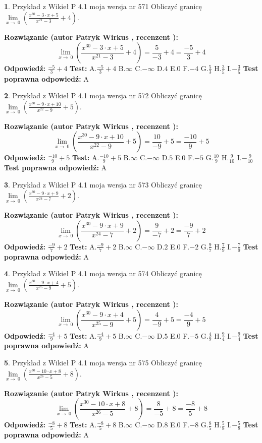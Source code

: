\documentclass[12pt, a4paper]{article}
\theoremstyle{definition} %
\newtheorem{zad}{}
\newcommand{\zadStart}[1]{\begin{zad}#1\newline}
\newcommand{\zadStop}{\end{zad}}
\newcommand{\rozwStart}[2]{\noindent \textbf{Rozwiązanie (autor #1 , recenzent #2): }\newline}
\newcommand{\rozwStop}{\newline}
\newcommand{\odpStart}{\noindent \textbf{Odpowiedź:}\newline}
\newcommand{\odpStop}{\newline}
\newcommand{\testStart}{\noindent \textbf{Test:}\newline}
\newcommand{\testStop}{\newline}
\newcommand{\kluczStart}{\noindent \textbf{Test poprawna odpowiedź:}\newline}
\newcommand{\kluczStop}{\newline}
\begin{document}
\zadStart{Przykład z Wikieł P 4.1 moja wersja nr 571}
Obliczyć granicę $\lim\limits_{x\to\ 0}(\frac{x^{30}-3 \cdot x +5}{x^{21}-3}+4)$.
\zadStop
\rozwStart{Patryk Wirkus}{}
$$\lim\limits_{x\to\ 0}(\frac{x^{30}-3 \cdot x +5}{x^{21}-3}+4)=\frac{5}{-3}+4=\frac{-5}{3}+4$$
\rozwStop
\odpStart
$\frac{-5}{3}+4$
\odpStop
\testStart
A.$\frac{-5}{3}+4$
B.$\infty$
C.$-\infty$
D.$4$
E.$0$
F.$-4$
G.$\frac{5}{3}$
H.$\frac{3}{5}$
I.$-\frac{3}{5}$
\testStop
\kluczStart
A
\kluczStop



\zadStart{Przykład z Wikieł P 4.1 moja wersja nr 572}
Obliczyć granicę $\lim\limits_{x\to\ 0}(\frac{x^{30}-9 \cdot x +10}{x^{22}-9}+5)$.
\zadStop
\rozwStart{Patryk Wirkus}{}
$$\lim\limits_{x\to\ 0}(\frac{x^{30}-9 \cdot x +10}{x^{22}-9}+5)=\frac{10}{-9}+5=\frac{-10}{9}+5$$
\rozwStop
\odpStart
$\frac{-10}{9}+5$
\odpStop
\testStart
A.$\frac{-10}{9}+5$
B.$\infty$
C.$-\infty$
D.$5$
E.$0$
F.$-5$
G.$\frac{10}{9}$
H.$\frac{9}{10}$
I.$-\frac{9}{10}$
\testStop
\kluczStart
A
\kluczStop



\zadStart{Przykład z Wikieł P 4.1 moja wersja nr 573}
Obliczyć granicę $\lim\limits_{x\to\ 0}(\frac{x^{30}-9 \cdot x +9}{x^{24}-7}+2)$.
\zadStop
\rozwStart{Patryk Wirkus}{}
$$\lim\limits_{x\to\ 0}(\frac{x^{30}-9 \cdot x +9}{x^{24}-7}+2)=\frac{9}{-7}+2=\frac{-9}{7}+2$$
\rozwStop
\odpStart
$\frac{-9}{7}+2$
\odpStop
\testStart
A.$\frac{-9}{7}+2$
B.$\infty$
C.$-\infty$
D.$2$
E.$0$
F.$-2$
G.$\frac{9}{7}$
H.$\frac{7}{9}$
I.$-\frac{7}{9}$
\testStop
\kluczStart
A
\kluczStop



\zadStart{Przykład z Wikieł P 4.1 moja wersja nr 574}
Obliczyć granicę $\lim\limits_{x\to\ 0}(\frac{x^{30}-9 \cdot x +4}{x^{25}-9}+5)$.
\zadStop
\rozwStart{Patryk Wirkus}{}
$$\lim\limits_{x\to\ 0}(\frac{x^{30}-9 \cdot x +4}{x^{25}-9}+5)=\frac{4}{-9}+5=\frac{-4}{9}+5$$
\rozwStop
\odpStart
$\frac{-4}{9}+5$
\odpStop
\testStart
A.$\frac{-4}{9}+5$
B.$\infty$
C.$-\infty$
D.$5$
E.$0$
F.$-5$
G.$\frac{4}{9}$
H.$\frac{9}{4}$
I.$-\frac{9}{4}$
\testStop
\kluczStart
A
\kluczStop



\zadStart{Przykład z Wikieł P 4.1 moja wersja nr 575}
Obliczyć granicę $\lim\limits_{x\to\ 0}(\frac{x^{30}-10 \cdot x +8}{x^{26}-5}+8)$.
\zadStop
\rozwStart{Patryk Wirkus}{}
$$\lim\limits_{x\to\ 0}(\frac{x^{30}-10 \cdot x +8}{x^{26}-5}+8)=\frac{8}{-5}+8=\frac{-8}{5}+8$$
\rozwStop
\odpStart
$\frac{-8}{5}+8$
\odpStop
\testStart
A.$\frac{-8}{5}+8$
B.$\infty$
C.$-\infty$
D.$8$
E.$0$
F.$-8$
G.$\frac{8}{5}$
H.$\frac{5}{8}$
I.$-\frac{5}{8}$
\testStop
\kluczStart
A
\kluczStop
\end{document}
